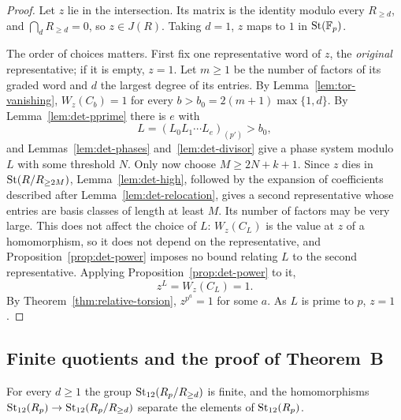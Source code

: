 \begin{proof}
Let $z$ lie in the intersection. Its matrix is the identity modulo every $R_{\geq d}$, and $\bigcap_dR_{\geq d}=0$, so
$z\in J(R)$. Taking $d=1$, $z$ maps to $1$ in $\operatorname{St}(\mathbb F_p)$.

The order of choices matters. First fix one representative word of $z$, the \emph{original} representative; if it is
empty, $z=1$. Let $m\geq1$ be the number of factors of its graded word and $d$ the largest degree of its entries. By Lemma~\ref{lem:tor-vanishing},
$W_z(C_b)=1$ for every $b>b_0=2(m+1)\max\{1,d\}$. By Lemma~\ref{lem:det-pprime} there is $e$ with
\[
 L=(L_0L_1\cdots L_e)_{(p')}>b_0,
\]
and Lemmas~\ref{lem:det-phases} and~\ref{lem:det-divisor} give a phase system modulo $L$ with some threshold $N$. Only
now choose $M\geq2N+k+1$. Since $z$ dies in $\operatorname{St}(R/R_{\geq2M})$, Lemma~\ref{lem:det-high}, followed by the expansion of
coefficients described after Lemma~\ref{lem:det-relocation}, gives a second representative whose entries are basis
classes of length at least $M$. Its number of factors may be very large. This does not affect the choice of $L$:
$W_z(C_L)$ is the value at $z$ of a homomorphism, so it does not depend on the representative, and
Proposition~\ref{prop:det-power} imposes no bound relating $L$ to the second representative. Applying
Proposition~\ref{prop:det-power} to it,
\[
 z^L=W_z(C_L)=1.
\]
By Theorem~\ref{thm:relative-torsion}, $z^{p^a}=1$ for some $a$. As $L$ is prime to $p$, $z=1$.
\end{proof}

\subsection{Finite quotients and the proof of Theorem~B}

\begin{proposition}\label{prop:det-truncations}
For every $d\geq1$ the group $\operatorname{St}_{12}(R_p/R_{\geq d})$ is finite, and the homomorphisms
$\operatorname{St}_{12}(R_p)\to\operatorname{St}_{12}(R_p/R_{\geq d})$ separate the elements of $\operatorname{St}_{12}(R_p)$.
\end{proposition}

